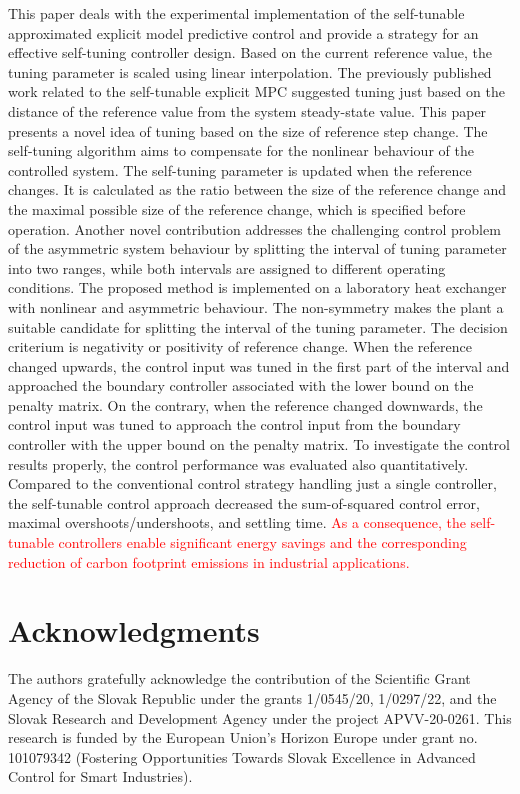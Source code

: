 \documentclass[preprint,12pt]{elsarticle}
\begin{document}
	This paper deals with the experimental implementation of the self-tunable approximated explicit model predictive control and provide a strategy for an effective self-tuning controller design. Based on the current reference value, the tuning parameter is scaled using linear interpolation. The previously published work related to the self-tunable explicit MPC suggested tuning just based on the distance of the reference value from the system steady-state value. This paper presents a novel idea of tuning based on the size of reference step change. The self-tuning algorithm aims to compensate for the nonlinear behaviour of the controlled system. The self-tuning parameter is updated when the reference changes. It is calculated as the ratio between the size of the reference change and the maximal possible size of the reference change, which is specified before operation. Another novel contribution addresses the challenging control problem of the asymmetric system behaviour by splitting the interval of tuning parameter into two ranges, while both intervals are assigned to different operating conditions. The proposed method is implemented on a laboratory heat exchanger with nonlinear and asymmetric behaviour. The non-symmetry makes the plant a suitable candidate for splitting the interval of the tuning parameter. The decision criterium is negativity or positivity of reference change. When the reference changed upwards, the control input was tuned in the first part of the interval and approached the boundary controller associated with the lower bound on the penalty matrix. On the contrary, when the reference changed downwards, the control input was tuned to approach the control input from the boundary controller with the upper bound on the penalty matrix. To investigate the control results properly, the control performance was evaluated also quantitatively. Compared to the conventional control strategy handling just a single controller, the self-tunable control approach decreased the sum-of-squared control error, maximal overshoots/undershoots, and settling time. \textcolor{red}{As a consequence, the self-tunable controllers enable significant energy savings and the corresponding reduction of carbon footprint emissions in industrial applications. }
	
	\section*{Acknowledgments}
	
	The authors gratefully acknowledge the contribution of the Scientific Grant Agency of the Slovak Republic under the grants 1/0545/20, 1/0297/22, and the Slovak Research and Development Agency under the project APVV-20-0261. 
	This research is funded by the European Union’s Horizon Europe under grant no. 101079342 (Fostering Opportunities Towards Slovak Excellence in Advanced Control for Smart Industries). 
	
\end{document}
